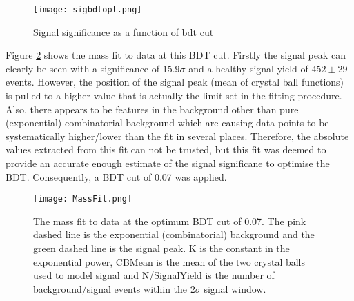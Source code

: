 \begin{figure}
  \centering
  \texttt{[image: sigbdtopt.png]}
  \caption{Signal significance as a function of bdt cut}
  \label{fig:bdtsigopt}
\end{figure}

Figure \ref{fig:massfit} shows the mass fit to data at this BDT cut.  Firstly the signal peak can clearly be seen with a significance of $15.9\sigma$ and a healthy signal yield of $452\pm29$ events.  However, the position of the signal peak (mean of crystal ball functions) is pulled to a higher value that is actually the limit set in the fitting procedure.  Also, there appears to be features in the background other than pure (exponential) combinatorial background which are causing data points to be systematically higher/lower than the fit in several places.  Therefore, the absolute values extracted from this fit can not be trusted, but this fit was deemed to provide an accurate enough estimate of the signal significane to optimise the BDT.  Consequently, a BDT cut of 0.07 was applied.

\begin{figure}
  \centering
  \texttt{[image: MassFit.png]}
  \caption{The mass fit to data at the optimum BDT cut of 0.07.  The pink dashed line is the exponential (combinatorial) background and the green dashed line is the signal peak.  K is the constant in the exponential power, CBMean is the mean of the two crystal balls used to model signal and N/SignalYield is the number of background/signal events within the $2\sigma$ signal window.}
  \label{fig:massfit}
\end{figure}
    


\clearpage

